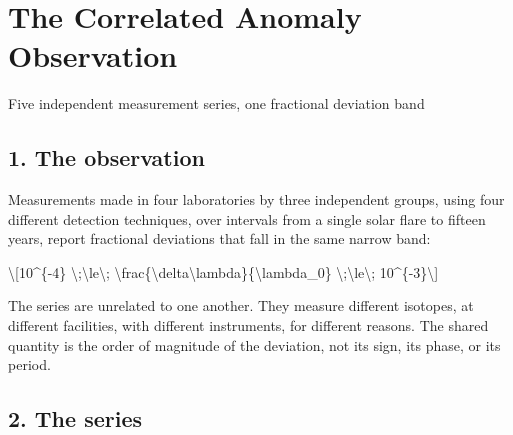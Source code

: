 \documentclass[
  10pt,
]{article}
\author{}
\date{}
\begin{document}
\hypertarget{the-correlated-anomaly-observation}{%
\section{The Correlated Anomaly
Observation}\label{the-correlated-anomaly-observation}}

Five independent measurement series, one fractional deviation band

\hypertarget{the-observation}{%
\subsection{1. The observation}\label{the-observation}}

Measurements made in four laboratories by three independent groups,
using four different detection techniques, over intervals from a single
solar flare to fifteen years, report fractional deviations that fall in
the same narrow band:

\textbackslash{[}10\^{}\{-4\}
\textbackslash;\textbackslash le\textbackslash;
\textbackslash frac\{\textbackslash delta\textbackslash lambda\}\{\textbackslash lambda\_0\}
\textbackslash;\textbackslash le\textbackslash;
10\^{}\{-3\}\textbackslash{]}

The series are unrelated to one another. They measure different
isotopes, at different facilities, with different instruments, for
different reasons. The shared quantity is the order of magnitude of the
deviation, not its sign, its phase, or its period.

\hypertarget{the-series}{%
\subsection{2. The series}\label{the-series}}
\end{document}
